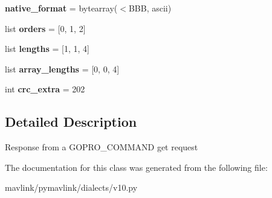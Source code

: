 \begin{DoxyCompactItemize}
{\bfseries native\+\_\+format} = bytearray(\textquotesingle{}$<$B\+BB\textquotesingle{}, \textquotesingle{}ascii\textquotesingle{})
\item 
\mbox{\label{classpymavlink_1_1dialects_1_1v10_1_1MAVLink__gopro__get__response__message_a410ebea2a79148ebd62f2be6729403c3}} 
list {\bfseries orders} = \mbox{[}0, 1, 2\mbox{]}
\item 
\mbox{\label{classpymavlink_1_1dialects_1_1v10_1_1MAVLink__gopro__get__response__message_aff9cb4380ac00a8ee5eabf3d98b04d35}} 
list {\bfseries lengths} = \mbox{[}1, 1, 4\mbox{]}
\item 
\mbox{\label{classpymavlink_1_1dialects_1_1v10_1_1MAVLink__gopro__get__response__message_abc5ddd5c7dce808df62fe069af02ec71}} 
list {\bfseries array\+\_\+lengths} = \mbox{[}0, 0, 4\mbox{]}
\item 
\mbox{\label{classpymavlink_1_1dialects_1_1v10_1_1MAVLink__gopro__get__response__message_a72fc0ff1470b3a69b8867d3369accbad}} 
int {\bfseries crc\+\_\+extra} = 202
\end{DoxyCompactItemize}


\subsection{Detailed Description}
\begin{DoxyVerb}Response from a GOPRO_COMMAND get request
\end{DoxyVerb}
 

The documentation for this class was generated from the following file\+:\begin{DoxyCompactItemize}
\item 
mavlink/pymavlink/dialects/v10.\+py\end{DoxyCompactItemize}
